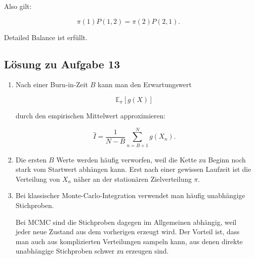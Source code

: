 \documentclass[11pt,a4paper]{article}
\newcommand{\E}{\mathbb{E}}
\begin{document}
Also gilt:

\[
\pi(1)P(1,2)=\pi(2)P(2,1).
\]

Detailed Balance ist erfüllt.

\subsection*{Lösung zu Aufgabe 13}

\begin{enumerate}
    \item Nach einer Burn-in-Zeit $B$ kann man den Erwartungswert

    \[
    \E_\pi[g(X)]
    \]

    durch den empirischen Mittelwert approximieren:

    \[
    \widehat I
    =
    \frac{1}{N-B}
    \sum_{n=B+1}^{N}g(X_n).
    \]

    \item Die ersten $B$ Werte werden häufig verworfen, weil die Kette zu Beginn noch stark vom Startwert abhängen kann. Erst nach einer gewissen Laufzeit ist die Verteilung von $X_n$ näher an der stationären Zielverteilung $\pi$.

    \item Bei klassischer Monte-Carlo-Integration verwendet man häufig unabhängige Stichproben.

    Bei MCMC sind die Stichproben dagegen im Allgemeinen abhängig, weil jeder neue Zustand aus dem vorherigen erzeugt wird. Der Vorteil ist, dass man auch aus komplizierten Verteilungen sampeln kann, aus denen direkte unabhängige Stichproben schwer zu erzeugen sind.
\end{enumerate}
\end{document}
